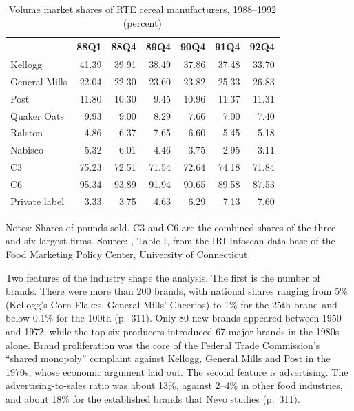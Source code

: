 \begin{table}[htbp]
\centering
\caption{Volume market shares of RTE cereal manufacturers, 1988--1992 (percent)}
\label{tab:08-nevo-shares}
\footnotesize
\begin{tabular}{@{}lrrrrrr@{}}
\toprule
 & 88Q1 & 88Q4 & 89Q4 & 90Q4 & 91Q4 & 92Q4 \\
\midrule
Kellogg & 41.39 & 39.91 & 38.49 & 37.86 & 37.48 & 33.70 \\
General Mills & 22.04 & 22.30 & 23.60 & 23.82 & 25.33 & 26.83 \\
Post & 11.80 & 10.30 & 9.45 & 10.96 & 11.37 & 11.31 \\
Quaker Oats & 9.93 & 9.00 & 8.29 & 7.66 & 7.00 & 7.40 \\
Ralston & 4.86 & 6.37 & 7.65 & 6.60 & 5.45 & 5.18 \\
Nabisco & 5.32 & 6.01 & 4.46 & 3.75 & 2.95 & 3.11 \\
\addlinespace
C3 & 75.23 & 72.51 & 71.54 & 72.64 & 74.18 & 71.84 \\
C6 & 95.34 & 93.89 & 91.94 & 90.65 & 89.58 & 87.53 \\
Private label & 3.33 & 3.75 & 4.63 & 6.29 & 7.13 & 7.60 \\
\bottomrule
\end{tabular}

\smallskip
\begin{minipage}{0.80\linewidth}
\footnotesize Notes: Shares of pounds sold. C3 and C6 are the combined shares of the three and six largest
firms. Source: \citet{Nevo2001}, Table I, from the IRI Infoscan data base of the Food Marketing Policy Center,
University of Connecticut.
\end{minipage}
\end{table}

Two features of the industry shape the analysis. The first is the number of brands. There were more than 200
brands, with national shares ranging from 5\% (Kellogg's Corn Flakes, General Mills' Cheerios) to 1\% for the
25th brand and below 0.1\% for the 100th (p.~311). Only 80 new brands appeared between 1950 and 1972, while
the top six producers introduced 67 major brands in the 1980s alone. Brand proliferation was the core of the
Federal Trade Commission's ``shared monopoly'' complaint against Kellogg, General Mills and Post in the 1970s,
whose economic argument \citet{Schmalensee1978} laid out. The second feature is advertising. The
advertising-to-sales ratio was about 13\%, against 2--4\% in other food industries, and about 18\% for the
established brands that Nevo studies (p.~311).

